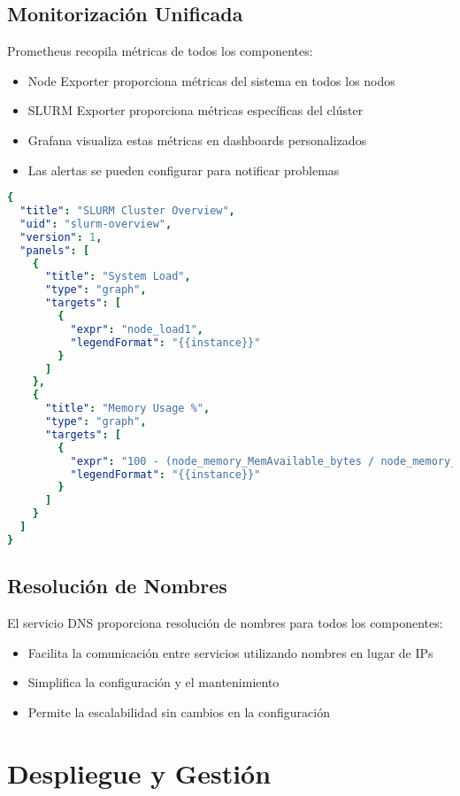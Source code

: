 \documentclass[12pt,a4paper]{article}
\begin{document}
\subsection{Monitorización Unificada}

Prometheus recopila métricas de todos los componentes:

\begin{itemize}[leftmargin=*]
    \item Node Exporter proporciona métricas del sistema en todos los nodos
    \item SLURM Exporter proporciona métricas específicas del clúster
    \item Grafana visualiza estas métricas en dashboards personalizados
    \item Las alertas se pueden configurar para notificar problemas
\end{itemize}

\begin{lstlisting}[language=yaml, caption=Configuración de dashboard de SLURM en Grafana]
{
  "title": "SLURM Cluster Overview",
  "uid": "slurm-overview",
  "version": 1,
  "panels": [
    {
      "title": "System Load",
      "type": "graph",
      "targets": [
        {
          "expr": "node_load1",
          "legendFormat": "{{instance}}"
        }
      ]
    },
    {
      "title": "Memory Usage %",
      "type": "graph",
      "targets": [
        {
          "expr": "100 - (node_memory_MemAvailable_bytes / node_memory_MemTotal_bytes * 100)",
          "legendFormat": "{{instance}}"
        }
      ]
    }
  ]
}
\end{lstlisting}

\subsection{Resolución de Nombres}

El servicio DNS proporciona resolución de nombres para todos los componentes:

\begin{itemize}[leftmargin=*]
    \item Facilita la comunicación entre servicios utilizando nombres en lugar de IPs
    \item Simplifica la configuración y el mantenimiento
    \item Permite la escalabilidad sin cambios en la configuración
\end{itemize}

\section{Despliegue y Gestión}
\newpage
\end{document}

